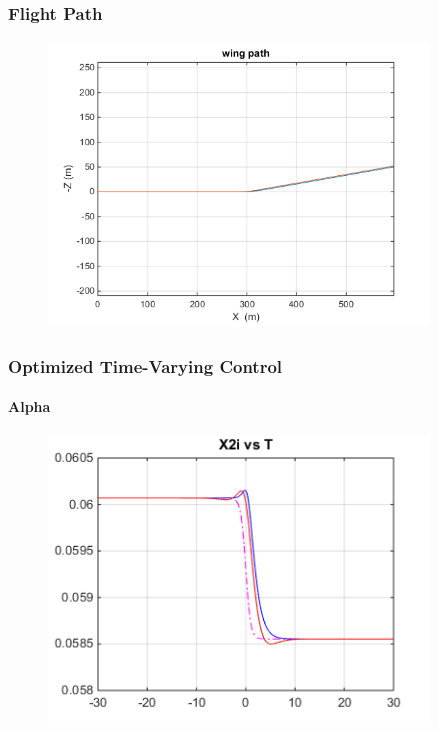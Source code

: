 \documentclass{beamer}
\begin{document}
    \begin{frame}
        \frametitle{Flight Path}
        \begin{figure}
            \centering
            \includegraphics[width=0.9\textwidth]{Flightpath.png}
        \end{figure}
    \end{frame}



    \begin{frame}
        \frametitle{Optimized Time-Varying Control}
        \framesubtitle{Alpha}
        \begin{figure}
            \centering
            \includegraphics[width=0.9\textwidth]{alpha_it.png}
        \end{figure}
    \end{frame}
    
\end{document}
